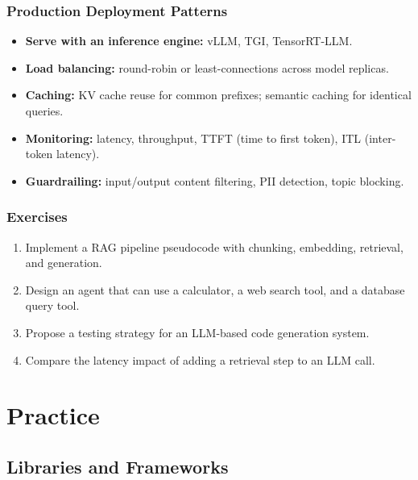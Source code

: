 \documentclass[11pt,a4paper]{book}
\theoremstyle{definition}
\begin{document}
\section{Production Deployment Patterns}

\begin{itemize}
	\item \textbf{Serve with an inference engine:} vLLM, TGI, TensorRT-LLM.
	\item \textbf{Load balancing:} round-robin or least-connections across model replicas.
	\item \textbf{Caching:} KV cache reuse for common prefixes; semantic caching for identical queries.
	\item \textbf{Monitoring:} latency, throughput, TTFT (time to first token), ITL (inter-token latency).
	\item \textbf{Guardrailing:} input/output content filtering, PII detection, topic blocking.
\end{itemize}

\section{Exercises}

\begin{enumerate}
	\item Implement a RAG pipeline pseudocode with chunking, embedding, retrieval, and generation.
	\item Design an agent that can use a calculator, a web search tool, and a database query tool.
	\item Propose a testing strategy for an LLM-based code generation system.
	\item Compare the latency impact of adding a retrieval step to an LLM call.
\end{enumerate}

\part{Practice}

\chapter{Libraries and Frameworks}
\label{ch:libraries}
\end{document}
